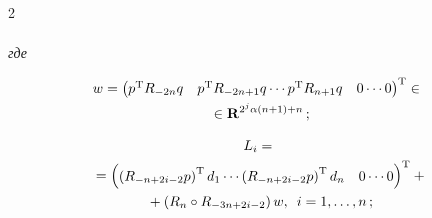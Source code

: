 \begin{multicols}{2}
\begin{multline*}
\end{multline*}


\textit{где} 


\begin{multline*}


\hspace*{-2pt}{w}=\begin{pmatrix}


{p}^{\mathrm{T}} R_{-2n}{q}&{p}^{\mathrm{T}} R_{-2n+1}{q} 


\cdots {p}^{\mathrm{T}} R_{n+1}{q}&0 \cdots 0 


\end{pmatrix}^{\mathrm{T}}


 \in{}\\


 {}\in \mathbf{R}^{2^j\alpha (n+1)+n}\,;


\end{multline*}





\vspace*{-12pt}





\noindent


\begin{multline*}


{L}_i={}\\


{}=\begin{pmatrix} 


\left(R_{-n+2i-2}{p}\right)^{\mathrm{T}} {d}_1 \cdots 


\left(R_{-n+2i-2}{p}\right)^{\mathrm{T}} {d}_n&0 \cdots 0


\end{pmatrix}^{\mathrm{T}}+ {}\\


{}+


\left(R_n\circ R_{-3n+2i-2}\right){w},\enskip


i=1,\dots,n\,;


\end{multline*}





\vspace*{-12pt}





\noindent


\begin{multline*}



\end{multline*}
\end{multicols}
